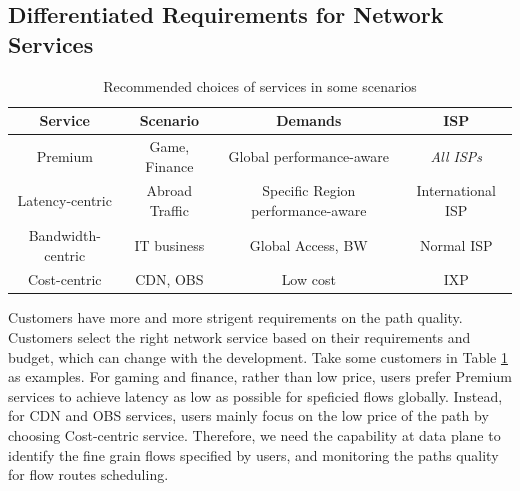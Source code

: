 
\subsection{Differentiated Requirements for Network Services} 



\begin{table}[tbp]
	\footnotesize
	\centering
	\begin{tabular}{c|c|c|c}
		\hline
		\bf{Service} & \bf{Scenario} & \bf{Demands} & \bf{ISP} \\
		\hline \hline
		Premium  & Game, Finance & Global performance-aware & \emph{All ISPs} \\
		\hline
		Latency-centric & Abroad Traffic & Specific Region performance-aware & International ISP \\
		\hline
	    Bandwidth-centric & IT business & Global Access, BW & Normal ISP \\
		\hline
	  Cost-centric & CDN, OBS & Low cost & IXP \\
		\hline
	\end{tabular}
        \vspace{-0.1in}
	\caption{\small Recommended choices of services in some scenarios}
	\label{table:classification}
\end{table}

Customers have more and more strigent requirements on the path quality. Customers select the right network service based on their requirements and budget, which can change with the development. Take some customers in Table \ref{table:classification} as examples. For gaming and finance, rather than low price, users prefer Premium services to achieve latency as low as possible for speficied flows globally. Instead, for CDN and OBS services, users mainly focus on the low price of the path by choosing Cost-centric service. Therefore, we need the capability at data plane to identify the fine grain flows specified by users, and monitoring the paths quality for flow routes scheduling.

